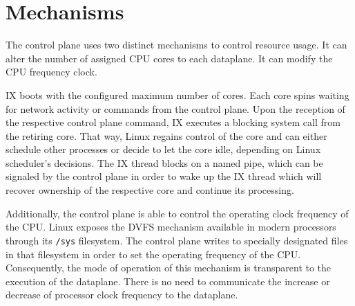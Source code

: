 \section{Mechanisms}

The control plane uses two distinct mechanisms to control resource usage.
It can alter the number of assigned CPU cores to each dataplane.
It can modify the CPU frequency clock.

IX boots with the configured maximum number of cores.
Each core spins waiting for network activity or commands from the control plane.
Upon the reception of the respective control plane command, IX executes a blocking system call from the retiring core.
That way, Linux regains control of the core and can either schedule other processes or decide to let the core idle, depending on Linux scheduler's decisions.
The IX thread blocks on a named pipe, which can be signaled by the control plane in order to wake up the IX thread which will recover ownership of the respective core and continue its processing.

Additionally, the control plane is able to control the operating clock frequency of the CPU.
Linux exposes the DVFS mechanism available in modern processors through its \texttt{/sys} filesystem.
The control plane writes to specially designated files in that filesystem in order to set the operating frequency of the CPU.
Consequently, the mode of operation of this mechanism is transparent to the execution of the dataplane.
There is no need to communicate the increase or decrease of processor clock frequency to the dataplane.

